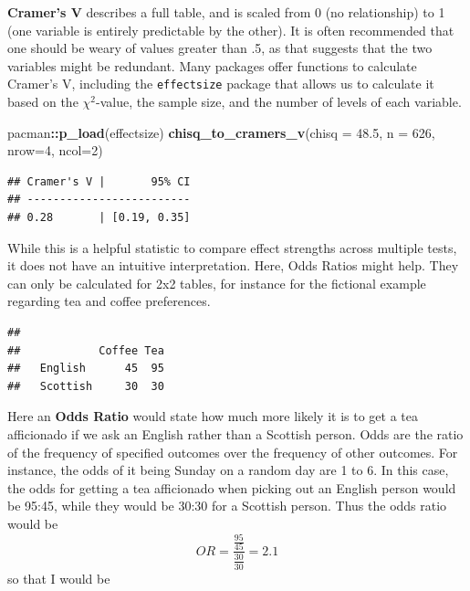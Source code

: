 \documentclass[
]{book}
\newenvironment{Shaded}{\begin{snugshade}}{\end{snugshade}}
\newcommand{\DataTypeTok}[1]{\textcolor[rgb]{0.13,0.29,0.53}{#1}}
\newcommand{\DecValTok}[1]{\textcolor[rgb]{0.00,0.00,0.81}{#1}}
\newcommand{\FloatTok}[1]{\textcolor[rgb]{0.00,0.00,0.81}{#1}}
\newcommand{\KeywordTok}[1]{\textcolor[rgb]{0.13,0.29,0.53}{\textbf{#1}}}
\newcommand{\NormalTok}[1]{#1}
\newcommand{\OperatorTok}[1]{\textcolor[rgb]{0.81,0.36,0.00}{\textbf{#1}}}
\begin{document}
\textbf{Cramer's V} describes a full table, and is scaled from 0 (no relationship) to 1 (one variable is entirely predictable by the other). It is often recommended that one should be weary of values greater than .5, as that suggests that the two variables might be redundant. Many packages offer functions to calculate Cramer's V, including the \texttt{effectsize} package that allows us to calculate it based on the \(\chi^2\)-value, the sample size, and the number of levels of each variable.

\begin{Shaded}
\begin{Highlighting}[]
\NormalTok{pacman}\OperatorTok{::}\KeywordTok{p_load}\NormalTok{(effectsize)}
\KeywordTok{chisq_to_cramers_v}\NormalTok{(}\DataTypeTok{chisq =} \FloatTok{48.5}\NormalTok{, }\DataTypeTok{n =} \DecValTok{626}\NormalTok{, }\DataTypeTok{nrow=}\DecValTok{4}\NormalTok{, }\DataTypeTok{ncol=}\DecValTok{2}\NormalTok{)}
\end{Highlighting}
\end{Shaded}

\begin{verbatim}
## Cramer's V |       95% CI
## -------------------------
## 0.28       | [0.19, 0.35]
\end{verbatim}

While this is a helpful statistic to compare effect strengths across multiple tests, it does not have an intuitive interpretation. Here, Odds Ratios might help. They can only be calculated for 2x2 tables, for instance for the fictional example regarding tea and coffee preferences.

\begin{verbatim}
##           
##            Coffee Tea
##   English      45  95
##   Scottish     30  30
\end{verbatim}

Here an \textbf{Odds Ratio} would state how much more likely it is to get a tea afficionado if we ask an English rather than a Scottish person. Odds are the ratio of the frequency of specified outcomes over the frequency of other outcomes. For instance, the odds of it being Sunday on a random day are 1 to 6. In this case, the odds for getting a tea afficionado when picking out an English person would be 95:45, while they would be 30:30 for a Scottish person. Thus the odds ratio would be \[OR = \frac{\frac{95}{45}}{\frac{30}{30}}=2.1\] so that I would be
\end{document}
